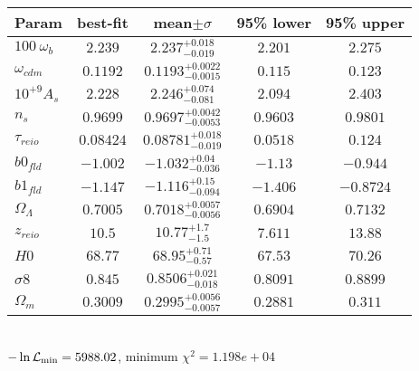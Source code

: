 \begin{tabular}{|l|c|c|c|c|} 
 \hline 
Param & best-fit & mean$\pm\sigma$ & 95\% lower & 95\% upper \\ \hline 
$100~\omega_{b }$ &$2.239$ & $2.237_{-0.019}^{+0.018}$ & $2.201$ & $2.275$ \\ 
$\omega_{cdm }$ &$0.1192$ & $0.1193_{-0.0015}^{+0.0022}$ & $0.115$ & $0.123$ \\ 
$10^{+9}A_{s }$ &$2.228$ & $2.246_{-0.081}^{+0.074}$ & $2.094$ & $2.403$ \\ 
$n_{s }$ &$0.9699$ & $0.9697_{-0.0053}^{+0.0042}$ & $0.9603$ & $0.9801$ \\ 
$\tau_{reio }$ &$0.08424$ & $0.08781_{-0.019}^{+0.018}$ & $0.0518$ & $0.124$ \\ 
$b0_{fld }$ &$-1.002$ & $-1.032_{-0.036}^{+0.04}$ & $-1.13$ & $-0.944$ \\ 
$b1_{fld }$ &$-1.147$ & $-1.116_{-0.094}^{+0.15}$ & $-1.406$ & $-0.8724$ \\ 
$\Omega_{\Lambda }$ &$0.7005$ & $0.7018_{-0.0056}^{+0.0057}$ & $0.6904$ & $0.7132$ \\ 
$z_{reio }$ &$10.5$ & $10.77_{-1.5}^{+1.7}$ & $7.611$ & $13.88$ \\ 
$H0$ &$68.77$ & $68.95_{-0.57}^{+0.71}$ & $67.53$ & $70.26$ \\ 
$\sigma8$ &$0.845$ & $0.8506_{-0.018}^{+0.021}$ & $0.8091$ & $0.8899$ \\ 
$\Omega_{m }$ &$0.3009$ & $0.2995_{-0.0057}^{+0.0056}$ & $0.2881$ & $0.311$ \\ 
\hline 
 \end{tabular} \\ 
$-\ln{\cal L}_\mathrm{min} =5988.02$, minimum $\chi^2=1.198e+04$ \\ 
